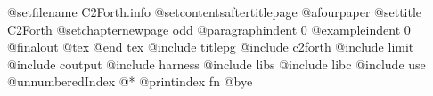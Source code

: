 
@setfilename            C2Forth.info
@setcontentsaftertitlepage
@afourpaper
@settitle               C2Forth
@setchapternewpage      odd
@paragraphindent        0
@exampleindent          0
@finalout
@tex
\newcount\sheetno{}
\global\def\advancepageno{\global\advance\sheetno 1\ifnum\pageno<0\global\advance\pageno -1\else\global\advance\pageno 1\fi}
@end tex
@include titlepg
@include c2forth
@include limit
@include coutput
@include harness
@include libs
@include libc
@include use
@unnumbered{Index}
@*
@printindex fn
@bye
